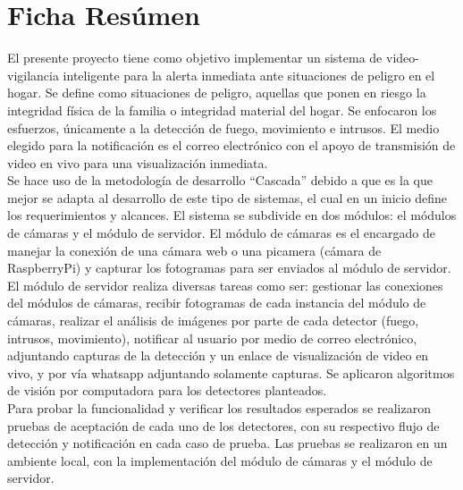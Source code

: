 \chapter{\centering Ficha Resúmen}

\begin{center}
    \begin{minipage}{14cm}

    El presente proyecto tiene como objetivo implementar un sistema de video-vigilancia inteligente para la alerta inmediata ante situaciones de peligro en el hogar. Se define como situaciones de peligro, aquellas que ponen en riesgo la integridad física de la familia o integridad material del hogar. Se enfocaron los esfuerzos, únicamente a la detección de fuego, movimiento e intrusos. El medio elegido para la notificación es el correo electrónico con el apoyo de transmisión de video en vivo para una visualización inmediata.\\

    Se hace uso de la metodología de desarrollo ``Cascada'' debido a que es la que mejor se adapta al desarrollo de este tipo de sistemas, el cual en un inicio define los requerimientos y alcances. El sistema se subdivide en dos módulos: el módulos de cámaras y el módulo de servidor.  El módulo de cámaras es el encargado de manejar la conexión de una cámara web o una picamera (cámara de RaspberryPi) y capturar los fotogramas para ser enviados al módulo de servidor. El módulo de servidor realiza diversas tareas como ser: gestionar las conexiones del módulos de cámaras, recibir fotogramas de cada instancia del módulo de cámaras, realizar el análisis de imágenes por parte de cada detector (fuego, intrusos, movimiento), notificar al usuario por medio de correo electrónico, adjuntando capturas de la detección y un enlace de visualización de video en vivo, y por vía whatsapp adjuntando solamente capturas. Se aplicaron algoritmos de visión por computadora para los detectores planteados.\\

    Para probar la funcionalidad y verificar los resultados esperados se realizaron pruebas de aceptación de cada uno de los detectores, con su respectivo flujo de detección y notificación en cada caso de prueba. Las pruebas se realizaron en un ambiente local, con la implementación del módulo de cámaras y el módulo de servidor.\\
    \end{minipage}
\end{center}